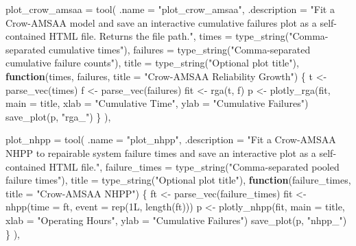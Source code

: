 \documentclass[
  letterpaper,
  DIV=11,
  numbers=noendperiod]{scrreprt}
\newenvironment{Shaded}{\begin{snugshade}}{\end{snugshade}}
\newcommand{\AttributeTok}[1]{\textcolor[rgb]{0.40,0.45,0.13}{#1}}
\newcommand{\ControlFlowTok}[1]{\textcolor[rgb]{0.00,0.23,0.31}{\textbf{#1}}}
\newcommand{\DecValTok}[1]{\textcolor[rgb]{0.68,0.00,0.00}{#1}}
\newcommand{\FunctionTok}[1]{\textcolor[rgb]{0.28,0.35,0.67}{#1}}
\newcommand{\NormalTok}[1]{\textcolor[rgb]{0.00,0.23,0.31}{#1}}
\newcommand{\OtherTok}[1]{\textcolor[rgb]{0.00,0.23,0.31}{#1}}
\newcommand{\StringTok}[1]{\textcolor[rgb]{0.13,0.47,0.30}{#1}}
\begin{document}
\begin{Shaded}
\begin{Highlighting}[]
    \AttributeTok{plot\_crow\_amsaa =} \FunctionTok{tool}\NormalTok{(}
      \AttributeTok{.name        =} \StringTok{"plot\_crow\_amsaa"}\NormalTok{,}
      \AttributeTok{.description =} \StringTok{"Fit a Crow{-}AMSAA model and save an interactive cumulative}
\StringTok{                      failures plot as a self{-}contained HTML file. Returns the file path."}\NormalTok{,}
      \AttributeTok{times    =} \FunctionTok{type\_string}\NormalTok{(}\StringTok{"Comma{-}separated cumulative times"}\NormalTok{),}
      \AttributeTok{failures =} \FunctionTok{type\_string}\NormalTok{(}\StringTok{"Comma{-}separated cumulative failure counts"}\NormalTok{),}
      \AttributeTok{title    =} \FunctionTok{type\_string}\NormalTok{(}\StringTok{"Optional plot title"}\NormalTok{),}
      \ControlFlowTok{function}\NormalTok{(times, failures, }\AttributeTok{title =} \StringTok{"Crow{-}AMSAA Reliability Growth"}\NormalTok{) \{}
\NormalTok{        t   }\OtherTok{\textless{}{-}} \FunctionTok{parse\_vec}\NormalTok{(times)}
\NormalTok{        f   }\OtherTok{\textless{}{-}} \FunctionTok{parse\_vec}\NormalTok{(failures)}
\NormalTok{        fit }\OtherTok{\textless{}{-}} \FunctionTok{rga}\NormalTok{(t, f)}
\NormalTok{        p   }\OtherTok{\textless{}{-}} \FunctionTok{plotly\_rga}\NormalTok{(fit, }\AttributeTok{main =}\NormalTok{ title,}
                          \AttributeTok{xlab =} \StringTok{"Cumulative Time"}\NormalTok{,}
                          \AttributeTok{ylab =} \StringTok{"Cumulative Failures"}\NormalTok{)}
        \FunctionTok{save\_plot}\NormalTok{(p, }\StringTok{"rga\_"}\NormalTok{)}
\NormalTok{      \}}
\NormalTok{    ),}

    \AttributeTok{plot\_nhpp =} \FunctionTok{tool}\NormalTok{(}
      \AttributeTok{.name        =} \StringTok{"plot\_nhpp"}\NormalTok{,}
      \AttributeTok{.description =} \StringTok{"Fit a Crow{-}AMSAA NHPP to repairable system failure times and}
\StringTok{                      save an interactive plot as a self{-}contained HTML file."}\NormalTok{,}
      \AttributeTok{failure\_times =} \FunctionTok{type\_string}\NormalTok{(}\StringTok{"Comma{-}separated pooled failure times"}\NormalTok{),}
      \AttributeTok{title         =} \FunctionTok{type\_string}\NormalTok{(}\StringTok{"Optional plot title"}\NormalTok{),}
      \ControlFlowTok{function}\NormalTok{(failure\_times, }\AttributeTok{title =} \StringTok{"Crow{-}AMSAA NHPP"}\NormalTok{) \{}
\NormalTok{        ft  }\OtherTok{\textless{}{-}} \FunctionTok{parse\_vec}\NormalTok{(failure\_times)}
\NormalTok{        fit }\OtherTok{\textless{}{-}} \FunctionTok{nhpp}\NormalTok{(}\AttributeTok{time =}\NormalTok{ ft, }\AttributeTok{event =} \FunctionTok{rep}\NormalTok{(}\DecValTok{1}\NormalTok{L, }\FunctionTok{length}\NormalTok{(ft)))}
\NormalTok{        p   }\OtherTok{\textless{}{-}} \FunctionTok{plotly\_nhpp}\NormalTok{(fit, }\AttributeTok{main =}\NormalTok{ title,}
                           \AttributeTok{xlab =} \StringTok{"Operating Hours"}\NormalTok{,}
                           \AttributeTok{ylab =} \StringTok{"Cumulative Failures"}\NormalTok{)}
        \FunctionTok{save\_plot}\NormalTok{(p, }\StringTok{"nhpp\_"}\NormalTok{)}
\NormalTok{      \}}
\NormalTok{    ),}


\end{Highlighting}
\end{Shaded}
\end{document}
